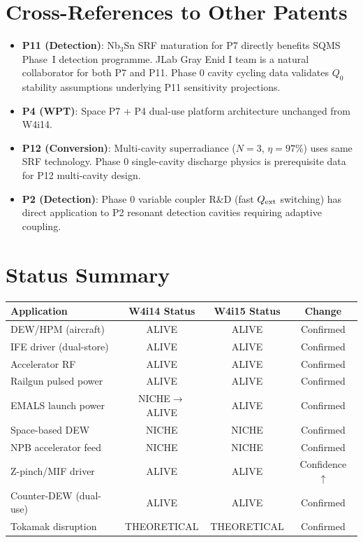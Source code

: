 \documentclass[11pt]{article}
\begin{document}
\section{Cross-References to Other Patents}

\begin{itemize}[nosep]
  \item \textbf{P11 (Detection)}: Nb$_3$Sn SRF maturation for P7
    directly benefits SQMS Phase~I detection programme. JLab
    Gray Enid I team is a natural collaborator for both P7 and P11.
    Phase 0 cavity cycling data validates $Q_0$ stability
    assumptions underlying P11 sensitivity projections.
  \item \textbf{P4 (WPT)}: Space P7 + P4 dual-use platform
    architecture unchanged from W4i14.
  \item \textbf{P12 (Conversion)}: Multi-cavity superradiance
    ($N = 3$, $\eta = 97\%$) uses same SRF technology.
    Phase 0 single-cavity discharge physics is prerequisite
    data for P12 multi-cavity design.
  \item \textbf{P2 (Detection)}: Phase 0 variable coupler R\&D
    (fast $Q_{\rm ext}$ switching) has direct application to P2
    resonant detection cavities requiring adaptive coupling.
\end{itemize}

\section{Status Summary}

\begin{center}
\begin{tabular}{lccc}
\toprule
Application & W4i14 Status & W4i15 Status & Change \\
\midrule
DEW/HPM (aircraft) & ALIVE & ALIVE & Confirmed \\
IFE driver (dual-store) & ALIVE & ALIVE & Confirmed \\
Accelerator RF & ALIVE & ALIVE & Confirmed \\
Railgun pulsed power & ALIVE & ALIVE & Confirmed \\
EMALS launch power & NICHE$\to$ALIVE & ALIVE & Confirmed \\
Space-based DEW & NICHE & NICHE & Confirmed \\
NPB accelerator feed & NICHE & NICHE & Confirmed \\
Z-pinch/MIF driver & ALIVE & ALIVE & Confidence $\uparrow$ \\
Counter-DEW (dual-use) & ALIVE & ALIVE & Confirmed \\
Tokamak disruption & THEORETICAL & THEORETICAL & Confirmed \\
\bottomrule
\end{tabular}
\end{center}
\end{document}
